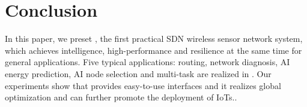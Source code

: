 \section{Conclusion}
\label{Con}

In this paper, we preset {\sdn}, the first practical SDN 
wireless sensor network system,
which achieves intelligence, high-performance and 
resilience at the same time for general applications. 
Five typical applications: routing, network diagnosis, AI energy prediction, 
AI node selection and multi-task are realized in {\sdn}.
%
Our experiments show that {\sdn} 
%
{\sdn} provides easy-to-use interfaces 
and it realizes global optimization and 
can further promote the deployment of IoTs..


